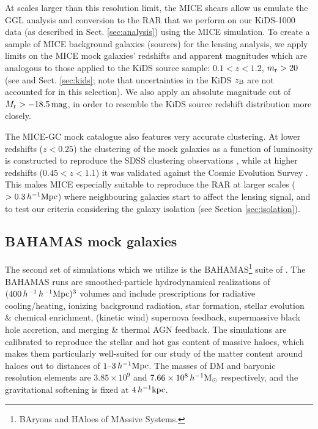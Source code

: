\documentclass[usenatbib]{mnras}
\newcommand{\homsun}{\,h^{-1} {\rm M_\odot}}
\newcommand{\hkpc}{\, h^{-1}{\rm{kpc}} }
\newcommand{\hMpc}{\, h^{-1}{\rm{Mpc}} }
\newcommand{\un}[1]{_{\rm #1}}
\begin{document}
At scales larger than this resolution limit, the MICE shears allow us emulate the GGL analysis and conversion to the RAR that we perform on our KiDS-1000 data (as described in Sect. \ref{sec:analysis}) using the MICE simulation. To create a sample of MICE background galaxies (sources) for the lensing analysis, we apply limits on the MICE mock galaxies' redshifts and apparent magnitudes which are analogous to those applied to the KiDS source sample: $0.1 < z < 1.2$, $m\un{r}>20$ (see \citealp{hildebrandt2017} and Sect. \ref{sec:kids}; note that uncertainties in the KiDS $z\un{B}$ are not accounted for in this selection). We also apply an absolute magnitude cut of $M\un{r}>-18.5 \, {\rm mag}$, in order to resemble the KiDS source redshift distribution more closely.

The MICE-GC mock catalogue also features very accurate clustering. At lower redshifts ($z<0.25$) the clustering of the mock galaxies as a function of luminosity is constructed to reproduce the SDSS clustering observations \cite[]{zehavi2011}, while at higher redshifts ($0.45<z<1.1$) it was validated against the Cosmic Evolution Survey \cite[COSMOS,][]{ilbert2009}. This makes MICE especially suitable to reproduce the RAR at larger scales ($>0.3\hMpc$) where neighbouring galaxies start to affect the lensing signal, and to test our criteria considering the galaxy isolation (see Section \ref{sec:isolation}).


\subsection{BAHAMAS mock galaxies}
\label{sec:bahamas_mocks}
The second set of simulations which we utilize is the BAHAMAS\footnote{BAryons and HAloes of MAssive Systems.} suite of \citet{mccarthy2017}. The BAHAMAS runs are smoothed-particle hydrodynamical realizations of $(400\,h^{-1}\hMpc)^3$ volumes and include prescriptions for radiative cooling/heating, ionizing background radiation, star formation, stellar evolution \& chemical enrichment, (kinetic wind) supernova feedback, supermassive black hole accretion, and merging \& thermal AGN feedback. The simulations are calibrated to reproduce the stellar and hot gas content of massive haloes, which makes them particularly well-suited for our study of the matter content around haloes out to distances of $1$--$3\hMpc$. The masses of DM and baryonic resolution elements are $3.85\times 10^9$ and $7.66\times 10^8 \homsun$ respectively, and the gravitational softening is fixed at $4 \hkpc$.
\end{document}
